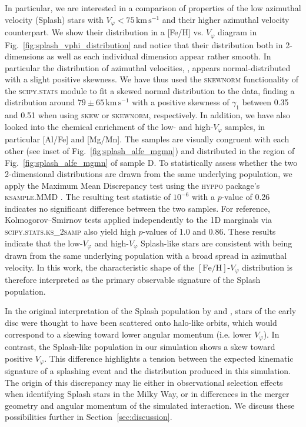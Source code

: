 \documentclass[fleqn,usenatbib]{mnras}
\begin{document}
In particular, we are interested in a comparison of properties of the low azimuthal velocity (Splash) stars with $V_\varphi < 75\,\mathrm{km\,s^{-1}}$ and their higher azimuthal velocity counterpart. We show their distribution in a [Fe/H] vs. $V_\varphi$ diagram in Fig.~\ref{fig:splash_vphi_distribution} and notice that their distribution both in 2-dimensions as well as each individual dimension appear rather smooth. In particular the distribution of azimuthal velocities, , appears normal-distributed with a slight positive skewness. We have thus used the \textsc{skewnorm} functionality of the \textsc{scipy.stats} module \citep{Scipy} to fit a skewed normal distribution to the data, finding a distribution around $79 \pm 65\,\mathrm{km\,s^{-1}}$ with a positive skewness of $\gamma_1$ between 0.35 and 0.51 when using \textsc{skew} or \textsc{skewnorm}, respectively. In addition, we have also looked into the chemical enrichment of the low- and high-$V_\varphi$ samples, in particular [Al/Fe] and [Mg/Mn]. The samples are visually congruent with each other (see inset of Fig.~\ref{fig:splash_alfe_mgmn}) and distributed in the region of Fig.~\ref{fig:splash_alfe_mgmn} of sample D. To statistically assess whether the two 2-dimensional distributions are drawn from the same underlying population, we apply the Maximum Mean Discrepancy test \citep{Gretton2012} using the \textsc{hyppo} package's \textsc{ksample.MMD} \citep{hyppo}. The resulting test statistic of $10^{-6}$ with a $p$-value of 0.26 indicates no significant difference between the two samples. For reference, Kolmogorov–Smirnov tests \citep{Hodges1958} applied independently to the 1D marginals via \textsc{scipy.stats.ks\_2samp} also yield high $p$-values of 1.0 and 0.86. These results indicate that the low-$V_\varphi$ and high-$V_\varphi$ Splash-like stars are consistent with being drawn from the same underlying population with a broad spread in azimuthal velocity. In this work, the characteristic shape of the $\mathrm{[Fe/H]}$-$V_\varphi$ distribution is therefore interpreted as the primary observable signature of the Splash population.

In the original interpretation of the Splash population by \citet{DiMatteo2019} and \citet{Belokurov2020}, stars of the early disc were thought to have been scattered onto halo-like orbits, which would correspond to a skewing toward lower angular momentum (i.e. lower $V_\varphi$). In contrast, the Splash-like population in our simulation shows a skew toward positive $V_\varphi$. This difference highlights a tension between the expected kinematic signature of a splashing event and the distribution produced in this simulation. The origin of this discrepancy may lie either in observational selection effects when identifying Splash stars in the Milky Way, or in differences in the merger geometry and angular momentum of the simulated interaction. We discuss these possibilities further in Section~\ref{sec:discussion}.
\end{document}
